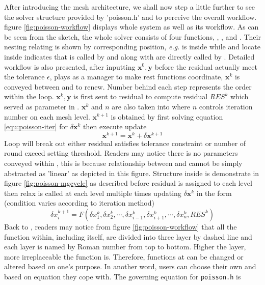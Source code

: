 After introducing the mesh architecture, we shall now step a little further to see the solver structure provided by 'poisson.h' and to perceive the overall workflow. figure \ref{fig:poisson-workflow} displays whole system as well as its workflow. As can be seen from the sketch, the whole solver consists of four functions, , ,  and . Their nesting relating is shown by corresponding position, \emph{e.g.}  is inside  while  and  locate inside  indicates that  is called by  and  along with  are directly called by . Detailed workflow is also presented, after inputting $ \mathbf{x}^0, \mathbf{y}$ before the residual actually meet the tolerance $\epsilon$,  plays as a manager to make rest functions coordinate, $ \mathbf{x}^k$ is conveyed between  and  to renew. Number behind each step represents the order within the loop. $ \mathbf{x}^k, \mathbf{y}$ is first sent to residual to compute residual $RES^k$ which served as parameter in . $ \mathbf{x}^k$ and $n$ are also taken into  where $n$ controls iteration number on each mesh level. $ \mathbf{x}^{k+1}$ is obtained by first solving equation \ref{equ:poisson-iter} for $\delta \mathbf{x}^k$ then execute update
\begin{equation}
  \mathbf{x}^{k+1} = \mathbf{x}^k + \delta \mathbf{x}^{k+1}
\end{equation}
Loop will break out either residual satisfies tolerance constraint or number of round exceed setting threshold. Readers may notice there is no parameters conveyed within , this is because relationship between  and  cannot be simply abstracted as 'linear' as depicted in this figure. Structure inside  is demonstrate in figure \ref{fig:poisson-mgcycle} as described before residual is assigned to each level then relax is called at each level multiple times updating $\delta \mathbf{x}^k$ in the form (condition varies according to iteration method)
\begin{equation}\label{equ:poisson-indirect}
  \delta x^{k+1}_i = F(\delta x^k_1,\delta x^k_2,\cdots,\delta x^k_{i-1},\delta x^k_{i+1},\cdots,\delta x_n^k, RES^k)
\end{equation}
Back to , readers may notice from figure \ref{fig:poisson-workflow} that all the function within, including  itself, are divided into three layer by dashed line and each layer is named by Roman number from top to bottom. Higher the layer, more irreplaceable the function is. Therefore, functions at  can be changed or altered based on one's purpose. In another word, users can choose their own  and  based on equation they cope with. The governing equation for \texttt{poisson.h} is
